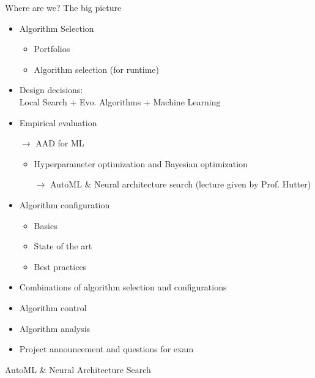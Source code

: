 \begin{frame}[c]{Where are we? The big picture}

\begin{itemize}
\item Algorithm Selection
  \begin{itemize}
    \item Portfolios
    \item Algorithm selection (for runtime)
  \end{itemize}
  \item Design decisions:\\ Local Search + Evo. Algorithms + Machine Learning 
  \item Empirical evaluation
  \item[$\to$] AAD for ML
  \begin{itemize}
    \item Hyperparameter optimization and Bayesian optimization 
    \item[$\to$] AutoML \& Neural architecture search (lecture given by Prof. Hutter)
  \end{itemize}
  \item Algorithm configuration 
  \begin{itemize}
    \item Basics 
    \item State of the art 
    \item Best practices 
  \end{itemize}
  \item Combinations of algorithm selection and configurations
  \item Algorithm control 
  \item Algorithm analysis 
  \item Project announcement and questions for exam 
\end{itemize}

\end{frame}
\begin{frame}[c]{}

\huge
\centering
AutoML \& Neural Architecture Search

\end{frame}
